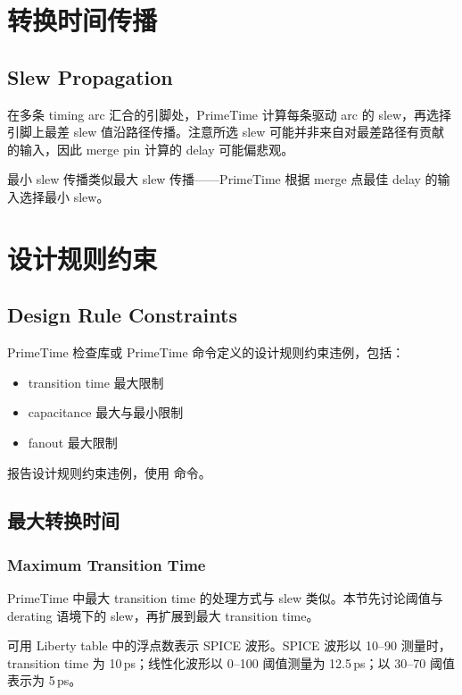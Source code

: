 \section{转换时间传播}
\subsection*{Slew Propagation}

在多条 timing arc 汇合的引脚处，PrimeTime 计算每条驱动 arc 的 slew，再选择引脚上最差 slew 值沿路径传播。注意所选 slew 可能并非来自对最差路径有贡献的输入，因此 merge pin 计算的 delay 可能偏悲观。


最小 slew 传播类似最大 slew 传播——PrimeTime 根据 merge 点最佳 delay 的输入选择最小 slew。


\section{设计规则约束}
\subsection*{Design Rule Constraints}

PrimeTime 检查库或 PrimeTime 命令定义的设计规则约束违例，包括：
\begin{itemize}
  \item transition time 最大限制
  \item capacitance 最大与最小限制
  \item fanout 最大限制
\end{itemize}

报告设计规则约束违例，使用  命令。

\subsection{最大转换时间}
\subsubsection*{Maximum Transition Time}

PrimeTime 中最大 transition time 的处理方式与 slew 类似。本节先讨论阈值与 derating 语境下的 slew，再扩展到最大 transition time。

可用 Liberty table 中的浮点数表示 SPICE 波形。SPICE 波形以 10--90 测量时，transition time 为 10\,ps；线性化波形以 0--100 阈值测量为 12.5\,ps；以 30--70 阈值表示为 5\,ps。

